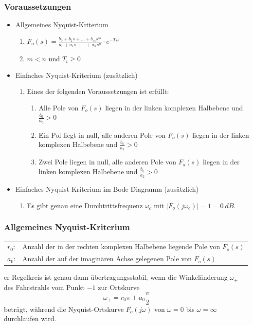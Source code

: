 \documentclass[10pt,a4paper]{article}
\begin{document}
\subsubsection{Voraussetzungen}
\begin{itemize}
	\item Allgemeines Nyquist-Kriterium
	\begin{enumerate}
		\item $F_o(s) = \frac{b_0 + b_1s + \dots + b_ms^m}{a_0 + a_1s + \dots + a_ns^n} ⋅ e^{-T_ts}$
		\item $m < n$ und $T_t ≥ 0$
	\end{enumerate}
	\item Einfaches Nyquist-Kriterium (zusätzlich)
	\begin{enumerate}
		\item Eines der folgenden Voraussetzungen ist erfüllt:
		\begin{enumerate}
			\item Alle Pole von $F_o(s)$ liegen in der linken komplexen Halbebene und $\frac{b_0}{a_0} > 0$
			\item Ein Pol liegt in null, alle anderen Pole von $F_o(s)$ liegen in der linken komplexen Halbebene und $\frac{b_0}{a_1} > 0$
			\item Zwei Pole liegen in null, alle anderen Pole von $F_o(s)$ liegen in der linken komplexen Halbebene und $\frac{b_0}{a_2} > 0$
		\end{enumerate}
	\end{enumerate}
	\item Einfaches Nyquist-Kriterium im Bode-Diagramm (zusätzlich)
	\begin{enumerate}
		\item Es gibt genau eine Durchtrittsfrequenz $\omega_c$ mit $|F_o(j \omega_c)| = 1 = 0 ~dB$. \\
	\end{enumerate}
\end{itemize}

\subsubsection{Allgemeines Nyquist-Kriterium}
\begin{tabular}{ll}
	$r_0$: & Anzahl der in der rechten komplexen Halbebene liegende Pole von $F_o(s)$ \\
	$a_0$: & Anzahl der auf der imaginären Achse gelegenen Pole von $F_o(s)$ \\
\end{tabular}
er Regelkreis ist genau dann übertragungsstabil, wenn die Winkeländerung $\omega_+$ des Fahrstrahls vom Punkt $-1$ zur Ortskurve
$$
	\omega_+ = r_0 \pi + a_0 \frac{\pi}{2}
$$
beträgt, während die Nyquist-Ortskurve $F_o(j \omega)$ von $\omega = 0$ bis $\omega = ∞$ durchlaufen wird. \\
\end{document}
